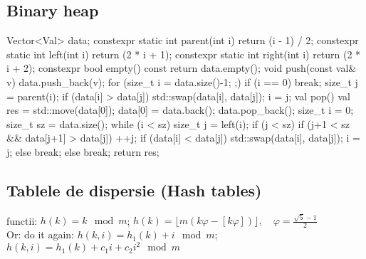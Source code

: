 \documentclass[11pt,a4paper]{report}
\begin{document}
\subsection*{Binary heap}
\begin{cpp}
Vector<Val> data;
constexpr static int parent(int i) { return (i - 1) / 2; }
constexpr static int left(int i) { return (2 * i + 1); }
constexpr static int right(int i) { return (2 * i + 2); }
constexpr bool empty() const { return data.empty(); }
void push(const val& v) {
    data.push_back(v);
    for (size_t i = data.size()-1; ;) {
        if (i == 0) break;
        size_t j = parent(i);
        if (data[i] > data[j]) {
            std::swap(data[i], data[j]);
            i = j;
        }
    }
}
val pop() {
    val res = std::move(data[0]);
    data[0] = data.back();
    data.pop_back();
    size_t i = 0;
    size_t sz = data.size();
    while (i < sz) {
        size_t j = left(i);
        if (j < sz) {
            if (j+1 < sz && data[j+1] > data[j]) ++j;
            if (data[i] < data[j]) {
                std::swap(data[i], data[j]);
                i = j;
            } else break;
        } else break;
    }
    return res;
}
\end{cpp}
\subsection*{Tablele de dispersie (Hash tables)}
functii: $h(k) = k \mod m $; \quad \quad
$h(k) = \lfloor m(k \varphi - [k\varphi]) \rfloor,\quad \varphi = \frac{\sqrt{5} - 1}{2}$\\
Or: do it again: $h(k, i) = h_1(k)+i \mod m$; \quad \quad
$h(k, i) = h_1(k)+c_1 i + c_2 i^2 \mod m$
\end{document}

